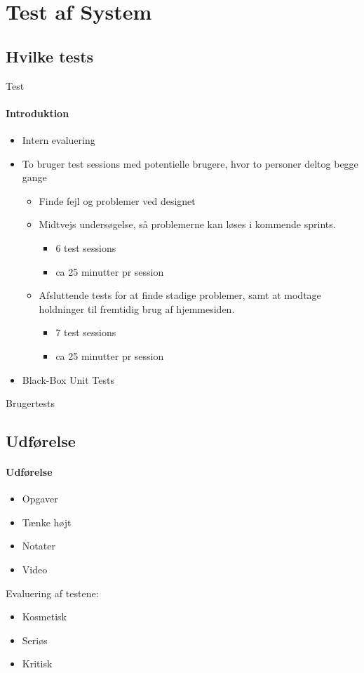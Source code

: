 \section{Test af System}

\subsection{Hvilke tests}
\begin{frame}{Test}
\framesubtitle{Introduktion}
	
	\begin{itemize}
	\item Intern evaluering
	\item	To bruger test sessions med potentielle brugere, hvor to personer deltog begge gange
		\begin{itemize}
			\item Finde fejl og problemer ved designet
			\item Midtvejs undersøgelse, så problemerne kan løses i kommende sprints.
				\begin{itemize}
					\item 6 test sessions
					\item ca 25 minutter pr session
				\end{itemize}
			\item Afsluttende tests for at finde stadige problemer, samt at modtage holdninger til fremtidig brug af hjemmesiden.
				\begin{itemize}
					\item 7 test sessions
					\item ca 25 minutter pr session
				\end{itemize}
		\end{itemize}
	\item 	Black-Box Unit Tests
	
	\end{itemize}
	
\end{frame}

\begin{frame}{Brugertests}
	\subsection{Udførelse}
	\framesubtitle{Udførelse}
	
	\begin{itemize}
		\item Opgaver 
		\item Tænke højt
		\item Notater
		\item Video	
	\end{itemize}
	
	Evaluering af testene:
	\begin{itemize}
		\item Kosmetisk
		\item Seriøs
		\item Kritisk
	\end{itemize}
	
\end{frame}
	
